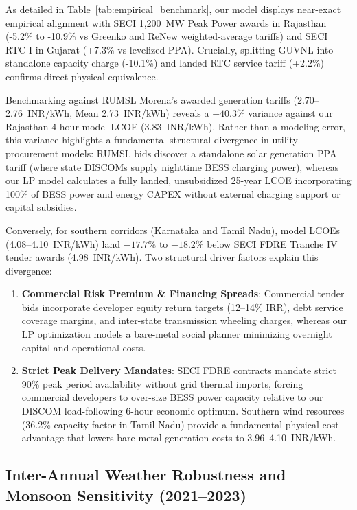 \documentclass[11pt,a4paper]{article}
\begin{document}


As detailed in Table~\ref{tab:empirical_benchmark}, our model displays near-exact empirical alignment with SECI 1,200~MW Peak Power awards in Rajasthan (-5.2\% to -10.9\% vs Greenko and ReNew weighted-average tariffs) and SECI RTC-I in Gujarat (+7.3\% vs levelized PPA). Crucially, splitting GUVNL into standalone capacity charge (-10.1\%) and landed RTC service tariff (+2.2\%) confirms direct physical equivalence.

Benchmarking against RUMSL Morena's awarded generation tariffs (2.70--2.76~INR/kWh, Mean 2.73~INR/kWh) reveals a $+40.3\%$ variance against our Rajasthan 4-hour model LCOE (3.83~INR/kWh). Rather than a modeling error, this variance highlights a fundamental structural divergence in utility procurement models: RUMSL bids discover a standalone solar generation PPA tariff (where state DISCOMs supply nighttime BESS charging power), whereas our LP model calculates a fully landed, unsubsidized 25-year LCOE incorporating 100\% of BESS power and energy CAPEX without external charging support or capital subsidies.

Conversely, for southern corridors (Karnataka and Tamil Nadu), model LCOEs (4.08--4.10~INR/kWh) land $-17.7\%$ to $-18.2\%$ below SECI FDRE Tranche IV tender awards (4.98~INR/kWh). Two structural driver factors explain this divergence:
\begin{enumerate}
    \item \textbf{Commercial Risk Premium \& Financing Spreads}: Commercial tender bids incorporate developer equity return targets (12--14\% IRR), debt service coverage margins, and inter-state transmission wheeling charges, whereas our LP optimization models a bare-metal social planner minimizing overnight capital and operational costs.
    \item \textbf{Strict Peak Delivery Mandates}: SECI FDRE contracts mandate strict 90\% peak period availability without grid thermal imports, forcing commercial developers to over-size BESS power capacity relative to our DISCOM load-following 6-hour economic optimum. Southern wind resources (36.2\% capacity factor in Tamil Nadu) provide a fundamental physical cost advantage that lowers bare-metal generation costs to 3.96--4.10~INR/kWh.
\end{enumerate}

\subsection{Inter-Annual Weather Robustness and Monsoon Sensitivity (2021--2023)}
\label{sec:weather_sensitivity}
\end{document}
